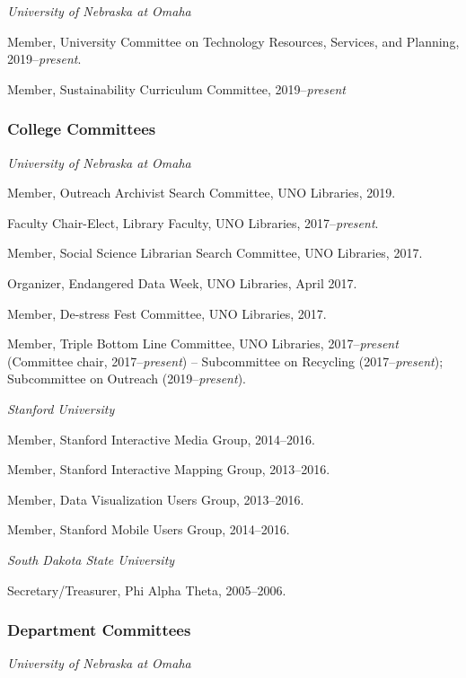 \emph{University of Nebraska at Omaha}

Member, University Committee on Technology Resources, Services, and
Planning, 2019--\emph{present}.

Member, Sustainability Curriculum Committee, 2019--\emph{present}

\subsubsection{College Committees}\label{college-committees}

\emph{University of Nebraska at Omaha}

Member, Outreach Archivist Search Committee, UNO Libraries, 2019.

Faculty Chair-Elect, Library Faculty, UNO Libraries,
2017--\emph{present}.

Member, Social Science Librarian Search Committee, UNO Libraries, 2017.

Organizer, Endangered Data Week, UNO Libraries, April 2017.

Member, De-stress Fest Committee, UNO Libraries, 2017.

Member, Triple Bottom Line Committee, UNO Libraries,
2017--\emph{present} (Committee chair, 2017--\emph{present}) --
Subcommittee on Recycling (2017--\emph{present}); Subcommittee on
Outreach (2019--\emph{present}).

\vspace{.4cm}

\emph{Stanford University}

Member, Stanford Interactive Media Group, 2014--2016.

Member, Stanford Interactive Mapping Group, 2013--2016.

Member, Data Visualization Users Group, 2013--2016.

Member, Stanford Mobile Users Group, 2014--2016.

\vspace{.4cm}

\emph{South Dakota State University}

Secretary/Treasurer, Phi Alpha Theta, 2005--2006.

\subsubsection{Department Committees}\label{department-committees}

\emph{University of Nebraska at Omaha}

